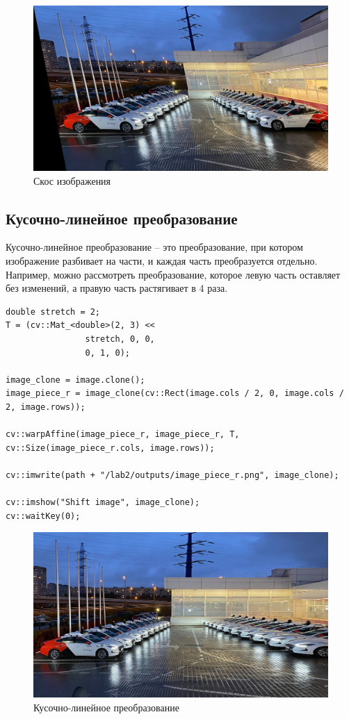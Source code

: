 \begin{figure}[ht]
\includegraphics[width=\textwidth]{../outputs/image_bevel.png}
\caption{Скос изображения}
\label{fig:sheared_image}
\end{figure}

\pagebreak
\subsection{Кусочно-линейное преобразование}

Кусочно-линейное преобразование -- это преобразование, при котором изображение разбивает на части, и каждая часть преобразуется отдельно.
Например, можно рассмотреть преобразование, которое левую часть оставляет без изменений, а правую часть растягивает в 4 раза.
\begin{lstlisting}[style=cpp_white, caption={Исходный код для кусочно-линейного преобразования}]
double stretch = 2;
T = (cv::Mat_<double>(2, 3) << 
                stretch, 0, 0, 
                0, 1, 0); 

image_clone = image.clone();
image_piece_r = image_clone(cv::Rect(image.cols / 2, 0, image.cols / 2, image.rows));

cv::warpAffine(image_piece_r, image_piece_r, T, cv::Size(image_piece_r.cols, image.rows)); 

cv::imwrite(path + "/lab2/outputs/image_piece_r.png", image_clone);

cv::imshow("Shift image", image_clone); 
cv::waitKey(0); 
\end{lstlisting}

\begin{figure}[ht]
    \includegraphics[width=\textwidth]{../outputs/image_piece_r.png}
    \caption{Кусочно-линейное преобразование}
    \label{fig:piecewise_linear_image}
\end{figure}


